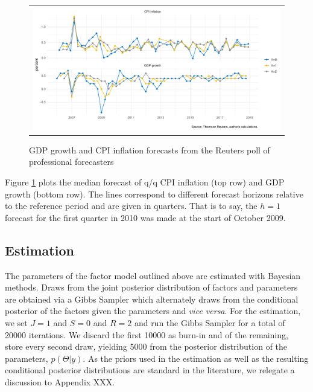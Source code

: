 \documentclass[notitlepage,a4paper,12pt]{article}
\begin{document}
\begin{figure}[htbp] \centering
    \caption{GDP growth and CPI inflation forecasts from the Reuters poll of professional forecasters \label{fig:reuterspoll}}
    \footnotesize
    \begin{tabular}{p{16cm}}
    \multicolumn{1}{c}{\includegraphics*[scale = 0.6]{../figures/fig_ReutersPoll.pdf}} \\
    \end{tabular}
    \newline
    \normalsize
\end{figure}

Figure \ref{fig:reuterspoll} plots the median forecast of q/q CPI inflation (top row) and GDP growth (bottom row). The lines correspond to different forecast horizons relative to the reference period and are given in quarters. That is to say, the $h=1$ forecast for the first quarter in 2010 was made at the start of October 2009. 
 

\subsection{Estimation}

The parameters of the factor model outlined above are estimated with Bayesian methods. Draws from the joint posterior distribution of factors and parameters are obtained via a Gibbs Sampler which alternately draws from the conditional posterior of the factors given the parameters and \textit{vice versa}. For the estimation, we set $J=1$ and $S=0$ and $R=2$ and run the Gibbs Sampler for a total of 20000 iterations. We discard the first 10000 as burn-in and of the remaining, store every second draw, yielding 5000 from the posterior distribution of the parameters, $p(\Theta|y)$. As the priors used in the estimation as well as the resulting conditional posterior distributions are standard in the literature, we relegate a discussion to Appendix XXX. 
\end{document}
